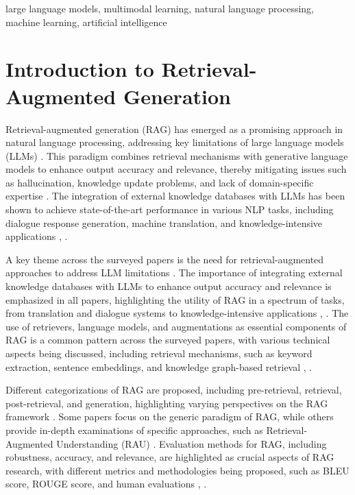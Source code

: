 \documentclass[conference]{IEEEtran}
\begin{document}
\begin{IEEEkeywords}
large language models, multimodal learning, natural language processing, machine learning, artificial intelligence
\end{IEEEkeywords}


\section{Introduction to Retrieval-Augmented Generation}
Retrieval-augmented generation (RAG) has emerged as a promising approach in natural language processing, addressing key limitations of large language models (LLMs) \cite{b1}. This paradigm combines retrieval mechanisms with generative language models to enhance output accuracy and relevance, thereby mitigating issues such as hallucination, knowledge update problems, and lack of domain-specific expertise \cite{b2}. The integration of external knowledge databases with LLMs has been shown to achieve state-of-the-art performance in various NLP tasks, including dialogue response generation, machine translation, and knowledge-intensive applications \cite{b3}, \cite{b4}.

A key theme across the surveyed papers is the need for retrieval-augmented approaches to address LLM limitations \cite{b5}. The importance of integrating external knowledge databases with LLMs to enhance output accuracy and relevance is emphasized in all papers, highlighting the utility of RAG in a spectrum of tasks, from translation and dialogue systems to knowledge-intensive applications \cite{b6}, \cite{b7}. The use of retrievers, language models, and augmentations as essential components of RAG is a common pattern across the surveyed papers, with various technical aspects being discussed, including retrieval mechanisms, such as keyword extraction, sentence embeddings, and knowledge graph-based retrieval \cite{b8}, \cite{b9}.

Different categorizations of RAG are proposed, including pre-retrieval, retrieval, post-retrieval, and generation, highlighting varying perspectives on the RAG framework \cite{b10}. Some papers focus on the generic paradigm of RAG, while others provide in-depth examinations of specific approaches, such as Retrieval-Augmented Understanding (RAU) \cite{b11}. Evaluation methods for RAG, including robustness, accuracy, and relevance, are highlighted as crucial aspects of RAG research, with different metrics and methodologies being proposed, such as BLEU score, ROUGE score, and human evaluations \cite{b12}, \cite{b13}.
\end{document}
